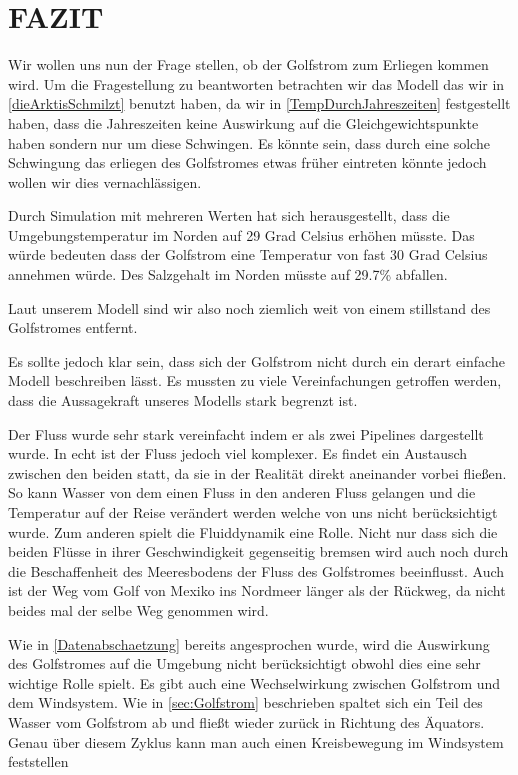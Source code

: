 \documentclass[a4paper,twoside]{article}
\begin{document}
	\section{\uppercase{Fazit}}\label{sec:Fazit}
	
	Wir wollen uns nun der Frage stellen, ob  der Golfstrom zum Erliegen kommen wird. Um die Fragestellung zu beantworten betrachten wir das Modell das wir in \ref{dieArktisSchmilzt} benutzt haben, da wir in \ref{TempDurchJahreszeiten} festgestellt haben, dass die Jahreszeiten keine Auswirkung auf die Gleichgewichtspunkte haben sondern nur um diese Schwingen. Es könnte sein, dass durch eine solche Schwingung das erliegen des Golfstromes etwas früher eintreten könnte jedoch wollen wir dies vernachlässigen.
	
	Durch Simulation mit mehreren Werten hat sich herausgestellt, dass die Umgebungstemperatur im Norden auf 29 Grad Celsius erhöhen müsste. Das würde bedeuten dass der Golfstrom eine Temperatur von fast 30 Grad Celsius annehmen würde. Des Salzgehalt im Norden müsste auf 29.7\% abfallen. 
	
	Laut unserem Modell sind wir also noch ziemlich weit von einem stillstand des Golfstromes entfernt. 
	
	Es sollte jedoch klar sein, dass sich der Golfstrom nicht durch ein derart einfache Modell beschreiben lässt. Es mussten zu viele Vereinfachungen getroffen werden, dass die Aussagekraft unseres Modells stark begrenzt ist. 
	
	Der Fluss wurde sehr stark vereinfacht indem er als zwei Pipelines dargestellt wurde. In echt ist der Fluss jedoch viel komplexer. Es findet ein Austausch zwischen den beiden statt, da sie in der Realität direkt aneinander vorbei fließen. So kann Wasser von dem einen Fluss in den anderen Fluss gelangen und die Temperatur auf der Reise verändert werden welche von uns nicht berücksichtigt wurde. Zum anderen spielt die Fluiddynamik eine Rolle. Nicht nur dass sich die beiden Flüsse in ihrer Geschwindigkeit gegenseitig bremsen wird auch noch durch die Beschaffenheit des Meeresbodens der Fluss des Golfstromes beeinflusst. Auch ist der Weg vom Golf von Mexiko ins Nordmeer länger als der Rückweg, da nicht beides mal der selbe Weg genommen wird.
	
	Wie in \ref{Datenabschaetzung} bereits angesprochen wurde, wird die Auswirkung des Golfstromes auf die Umgebung nicht berücksichtigt obwohl dies eine sehr wichtige Rolle spielt. Es gibt auch eine Wechselwirkung zwischen Golfstrom und dem Windsystem. Wie in \ref{sec:Golfstrom} beschrieben spaltet sich ein Teil des Wasser vom Golfstrom ab und fließt wieder zurück in Richtung des Äquators. Genau über diesem Zyklus kann man auch einen Kreisbewegung im Windsystem feststellen
	
\end{document}
